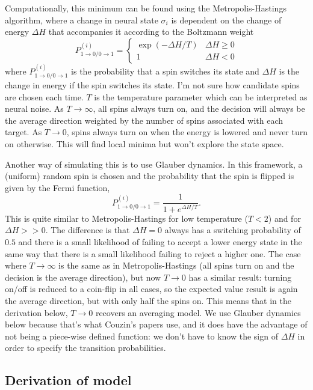 \documentclass[12pt]{article}
\begin{document}
Computationally, this minimum can be found using the Metropolis-Hastings algorithm, where a change in neural state $\sigma_i$ is dependent on the change of energy $\Delta H$ that accompanies it according to the Boltzmann weight
\[
P^{(i)}_{1\rightarrow0/0\rightarrow 1} = 
\begin{cases}
	\exp(-\Delta H/T) & \Delta H \geq 0\\
	1 & \Delta H < 0
\end{cases}
\]
where $P^{(i)}_{1\rightarrow0/0\rightarrow 1}$ is the probability that a spin switches its state and $\Delta H$ is the change in energy if the spin switches its state. I'm not sure how candidate spins are chosen each time. $T$ is the temperature parameter which can be interpreted as neural noise. As $T\rightarrow\infty$, all spins always turn on, and the decision will always be the average direction weighted by the number of spins associated with each target. As $T\rightarrow 0$, spins always turn on when the energy is lowered and never turn on otherwise. This will find local minima but won't explore the state space.

Another way of simulating this is to use Glauber dynamics. In this framework, a (uniform) random spin is chosen and the probability that the spin is flipped is given by the Fermi function,
\[
P^{(i)}_{1\rightarrow0/0\rightarrow 1} = \frac{1}{1 + e^{\Delta H/T}}.
\]
This is quite similar to Metropolis-Hastings for low temperature ($T<2$) and for $\Delta H >> 0$. The difference is that $\Delta H = 0$ always has a switching probability of $0.5$ and there is a small likelihood of failing to accept a lower energy state in the same way that there is a small likelihood failing to reject a higher one. The case where $T\rightarrow\infty$ is the same as in Metropolis-Hastings (all spins turn on and the decision is the average direction), but now $T\rightarrow 0$ has a similar result: turning on/off is reduced to a coin-flip in all cases, so the expected value result is again the average direction, but with only half the spins on. This means that in the derivation below, $T\rightarrow 0$ recovers an averaging model. We use Glauber dynamics below because that's what Couzin's papers use, and it does have the advantage of not being a piece-wise defined function: we don't have to know the sign of $\Delta H$ in order to specify the transition probabilities.

\subsection*{Derivation of model}
\end{document}
